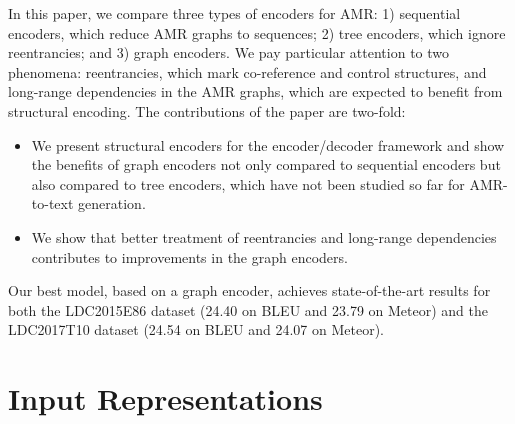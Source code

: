 \documentclass[11pt,a4paper]{article}
\begin{document}
In this paper, we compare three types of encoders for AMR: 1) sequential encoders, which reduce AMR graphs to sequences; 2) tree encoders, which ignore reentrancies; and 3) graph encoders. 
We pay particular attention to two phenomena: reentrancies, which mark co-reference and control structures, and long-range dependencies in the AMR graphs, which are expected to benefit from structural encoding. The contributions of the paper are two-fold:
\begin{itemize}
  \item We present structural encoders for the encoder/decoder framework and show the benefits of graph encoders not only compared to sequential encoders but also compared to tree encoders, which have not been studied so far for AMR-to-text generation.
  \item We show that better treatment of reentrancies and long-range dependencies contributes to improvements in the graph encoders.
\end{itemize}

Our best model, based on a graph encoder, achieves state-of-the-art results for both the LDC2015E86 dataset (24.40 on BLEU and 23.79 on Meteor) and the LDC2017T10 dataset (24.54 on BLEU and 24.07 on Meteor).

\section{Input Representations}
\label{sec:input}
\end{document}
